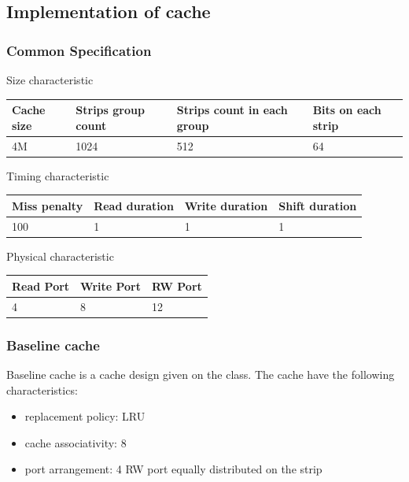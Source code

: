 \documentclass[11pt]{article}
\begin{document}
\subsection{Implementation of cache}

\subsubsection{Common Specification}

Size characteristic

\begin{center}
\begin{tabular}{llll}
\toprule
Cache size & Strips group count & Strips count in each group & Bits on each strip \\
\midrule
4M         & 1024               & 512                        & 64 \\
\bottomrule
\end{tabular}
\end{center}

Timing characteristic

\begin{center}
\begin{tabular}{llll}
\toprule
Miss penalty & Read duration & Write duration & Shift duration \\
\midrule
100          & 1             & 1              & 1             \\
\bottomrule
\end{tabular}
\end{center}

Physical characteristic

\begin{center}
\begin{tabular}{lll}
\toprule
Read Port & Write Port & RW Port \\
\midrule
4         & 8          & 12     \\
\bottomrule
\end{tabular}
\end{center}

\subsubsection{Baseline cache}
Baseline cache is a cache design given on the class. The cache have the following characteristics: 
\begin{itemize}
\item replacement policy: LRU
\item cache associativity: 8
\item port arrangement: 4 RW port equally distributed on the strip
\end{itemize}
\end{document}

